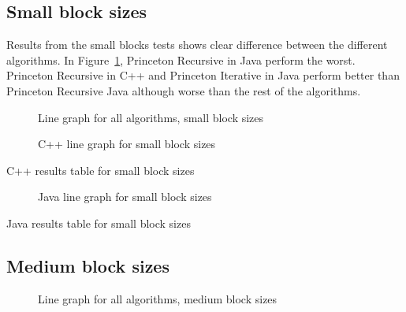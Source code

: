 \subsection{Small block sizes}
Results from the small blocks tests shows clear difference between the different algorithms. In Figure~\ref{fig:all:line:small}, Princeton Recursive in Java perform the worst. Princeton Recursive in C++ and Princeton Iterative in Java perform better than Princeton Recursive Java although worse than the rest of the algorithms. %




\begin{figure}
    \centering
    
    \caption{Line graph for all algorithms, small block sizes}
    \label{fig:all:line:small}
\end{figure}

\begin{figure}
    \centering
    
    \caption{C++ line graph for small block sizes}
    \label{fig:cpp:line:small}
\end{figure}
\begin{table}
    \centering
    \caption{C++ results table for small block sizes}
    \label{tab:cpp:small}
    \resizebox{\columnwidth}{!}{
        
    }
\end{table}


\begin{figure}
    \centering
    
    \caption{Java line graph for small block sizes}
    \label{fig:java:line:small}
\end{figure}
\begin{table}
    \centering
    \caption{Java results table for small block sizes}
    \label{tab:java:small}
    \resizebox{\columnwidth}{!}{
        
    }
\end{table}

\subsection{Medium block sizes}
\begin{figure}
    \centering
    
    \caption{Line graph for all algorithms, medium block sizes}
    \label{fig:all:line:medium}
\end{figure}

